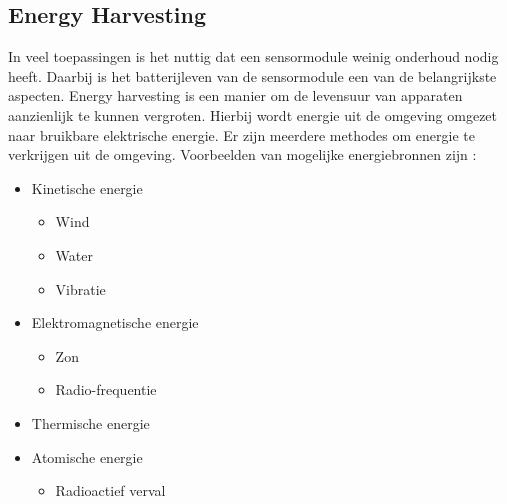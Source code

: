 \subsection{Energy Harvesting}
In veel toepassingen is het nuttig dat een sensormodule weinig onderhoud nodig heeft. Daarbij is het batterijleven van de sensormodule een van de belangrijkste aspecten. Energy harvesting is een manier om de levensuur van apparaten aanzienlijk te kunnen vergroten. Hierbij wordt energie uit de omgeving omgezet naar bruikbare elektrische energie. Er zijn meerdere methodes om energie te verkrijgen uit de omgeving. Voorbeelden van mogelijke energiebronnen zijn \cite{energyHarvesting}:
\begin{itemize}
    \item Kinetische energie
    \begin{itemize}
        \item Wind
        \item Water
        \item Vibratie
    \end{itemize}
    \item Elektromagnetische energie
    \begin{itemize}
        \item Zon
        \item Radio-frequentie
    \end{itemize}
    \item Thermische energie
    \item Atomische energie
    \begin{itemize}
        \item Radioactief verval
    \end{itemize}
\end{itemize}
